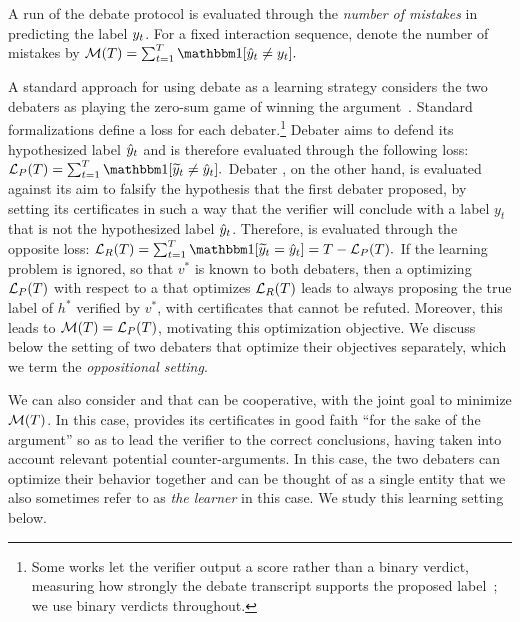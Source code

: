 \documentclass[11pt,letterpaper]{article}
\theoremstyle{definition}
\theoremstyle{plain}
\begin{document}
A run of the debate protocol is evaluated through the \emph{number of mistakes} in predicting the label $y_t$. For a fixed interaction sequence, denote the number of mistakes by
$\Mi(T) = \sum_{t = 1}^T \indct[\hy_t \neq \ty_t].$





A standard approach for using debate as a learning strategy considers the two debaters as playing the zero-sum game of winning the argument~\citep{irving2018debate,chen2023playing,browncohen2024debate,browncohen2025prover}.
Standard formalizations \citep{irving2018debate,browncohen2024debate} define a loss for each debater.\footnote{Some works let the verifier output a score rather than a binary verdict, measuring how strongly the debate transcript supports the proposed label~\citep{chen2023playing,arnesen2024training,browncohen2025prover}; we use binary verdicts throughout.} Debater \dt aims to defend its hypothesized label ${\hat{y}}_t$ and is therefore evaluated through the following loss: $\tLo(T) = \sum_{t = 1}^T \indct[\vy_t \neq \hy_t].$ 
Debater \df, on the other hand, is evaluated against its aim to falsify the hypothesis that the first debater proposed, by setting its certificates in such a way that the verifier will conclude with a label $y_t$ that is not the hypothesized label ${\hat{y}}_t$. 
Therefore, \df is evaluated through the opposite loss: 
 $\fLo(T) = \sum_{t = 1}^T \indct[\vy_t = \hy_t] = T - \tLo(T).$
If the learning problem is ignored, so that $v^*$ is known to both debaters, then a \dt optimizing ${{\mathcal L}_P}(T)$ with respect to a \df that optimizes ${{\mathcal L}_R}(T)$ leads to \dt always proposing the true label of $h^*$ verified by $v^*$, with certificates that cannot be refuted. Moreover, this leads to ${\mathcal M}(T) = {{\mathcal L}_P}(T)$, motivating this optimization objective. We discuss below the setting of two debaters that optimize their objectives separately, which we term the \emph{oppositional setting}. 

We can also consider \dt and \df that can be cooperative, with the joint goal to minimize ${\mathcal M}(T)$. 
In this case, \df provides its certificates in good faith ``for the sake of the argument'' so as to lead the verifier to the correct conclusions, having taken into account relevant potential counter-arguments. In this case, the two debaters can optimize their behavior together and can be thought of as a single entity that we also sometimes refer to as \emph{the learner} in this case. We study this learning setting below.
\end{document}
